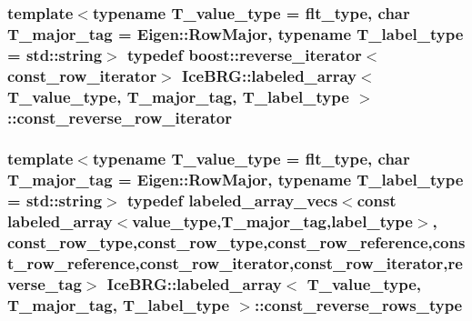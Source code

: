 \subsubsection[{const\+\_\+reverse\+\_\+row\+\_\+iterator}]{\setlength{\rightskip}{0pt plus 5cm}template$<$typename T\+\_\+value\+\_\+type = flt\+\_\+type, char T\+\_\+major\+\_\+tag = Eigen\+::\+Row\+Major, typename T\+\_\+label\+\_\+type = std\+::string$>$ typedef boost\+::reverse\+\_\+iterator$<${\bf const\+\_\+row\+\_\+iterator}$>$ {\bf Ice\+B\+R\+G\+::labeled\+\_\+array}$<$ T\+\_\+value\+\_\+type, T\+\_\+major\+\_\+tag, T\+\_\+label\+\_\+type $>$\+::{\bf const\+\_\+reverse\+\_\+row\+\_\+iterator}}\label{classIceBRG_1_1labeled__array_a5f03fa967c469ac1a6d16f7eccf48943}
\hypertarget{classIceBRG_1_1labeled__array_a4d8f245def66ea4352beb6299a657bfb}{}
\subsubsection[{const\+\_\+reverse\+\_\+rows\+\_\+type}]{\setlength{\rightskip}{0pt plus 5cm}template$<$typename T\+\_\+value\+\_\+type = flt\+\_\+type, char T\+\_\+major\+\_\+tag = Eigen\+::\+Row\+Major, typename T\+\_\+label\+\_\+type = std\+::string$>$ typedef {\bf labeled\+\_\+array\+\_\+vecs}$<$const {\bf labeled\+\_\+array}$<${\bf value\+\_\+type},T\+\_\+major\+\_\+tag,{\bf label\+\_\+type}$>$, {\bf const\+\_\+row\+\_\+type},{\bf const\+\_\+row\+\_\+type},{\bf const\+\_\+row\+\_\+reference},{\bf const\+\_\+row\+\_\+reference},{\bf const\+\_\+row\+\_\+iterator},{\bf const\+\_\+row\+\_\+iterator},{\bf reverse\+\_\+tag}$>$ {\bf Ice\+B\+R\+G\+::labeled\+\_\+array}$<$ T\+\_\+value\+\_\+type, T\+\_\+major\+\_\+tag, T\+\_\+label\+\_\+type $>$\+::{\bf const\+\_\+reverse\+\_\+rows\+\_\+type}}\label{classIceBRG_1_1labeled__array_a4d8f245def66ea4352beb6299a657bfb}
\hypertarget{classIceBRG_1_1labeled__array_a15c0340b56b118a2a9f4b3e644de7d71}{}
